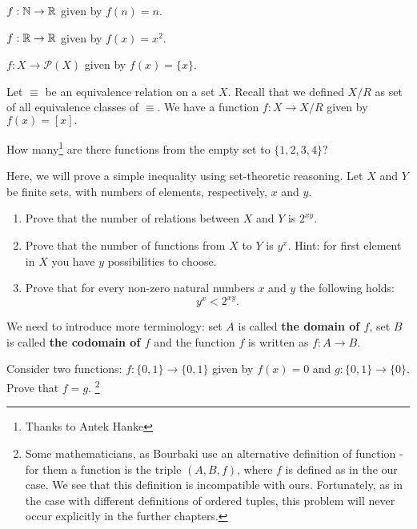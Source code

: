 \begin{example}
  $f: \mathbb N\to \mathbb R$ given by $f(n)=n$.
\end{example}

\begin{example}
  $f: \mathbb R\to \mathbb R$ given by $f(x)=x^2$.
\end{example}

\begin{example}
  $f: X\to \mathcal P(X)$ given by $f(x)=\{x\}$.
\end{example}

\begin{example}
  Let $\equiv$ be an equivalence relation on a set $X$. Recall that we
  defined $X/R$ as set of all equivalence classes of $\equiv$. We have a function
  $f: X\to X/R$ given by $f(x)=[x].$
\end{example}

\begin{prob}
	How many\footnote{Thanks to Antek Hanke} are there functions from the empty set to $\{1,2,3,4\}?$
\end{prob}

\begin{exercise}
  Here, we will prove a simple inequality using set-theoretic reasoning. Let $X$ and $Y$ be finite sets, with numbers of elements, respectively, $x$ and $y$.
  \begin{enumerate}
    \item Prove that the number of relations between $X$ and $Y$ is $2^{xy}$.
    \item Prove that the number of functions from $X$ to $Y$ is $y^x$. Hint: for first element in $X$ you have $y$ possibilities to choose.
    \item Prove that for every non-zero natural numbers $x$ and $y$ the following holds:
      $$y^x<2^{xy}.$$
  \end{enumerate}
\end{exercise}

We need to introduce more terminology: set $A$ is called \textbf{the domain of $f$}, set $B$ is called
\textbf{the codomain of $f$} and the function $f$ is written as $f: A\to B$.

\begin{prob}
	Consider two functions: $f:\{0, 1\}\to \{0,1\}$ given by $f(x)=0$ and $g:\{0,1\}\to\{0\}$.
	Prove that $f=g$.
	\footnote{Some mathematicians, as Bourbaki use an alternative definition of function - for them
	a function is the triple $(A,B,f)$, where $f$ is defined as in the our case. We see that this definition
	is incompatible with ours. Fortunately, as in the case with different definitions of ordered tuples,
	this problem will never occur explicitly in the further chapters.}
\end{prob}

